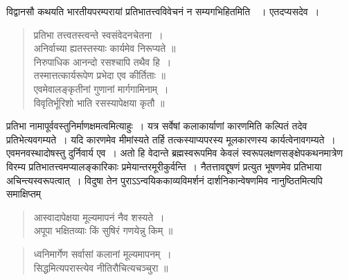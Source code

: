 {\dev विद्वानसौ कथयति भारतीयपरम्परायां प्रतिभातत्त्वविवेचनं न सम्यगभिहितमिति}~{\dev~। एतदप्यसदेव~।}
\begin{quote}
{\dev प्रतिभा तत्त्वतस्त्वन्ते स्वसंवेदनचेतना~।}\\
{\dev अनिर्वाच्या ह्यतस्तस्याः कार्यमेव निरूप्यते ॥}\\[5pt]
{\dev निरुपाधिक आनन्दो रसश्चापि तथैव हि~।}\\
{\dev तस्मात्तत्कार्यरूपेण प्रभेदा एव कीर्तिताः ॥}\\[5pt]
{\dev एवमेवालङ्कृतीनां गुणानां मार्गगामिनाम्~।}\\
{\dev विवृतिर्भूरिशो भाति रसस्यापेक्षया कृतौ ॥}
\end{quote}

{\dev प्रतिभा नामापूर्ववस्तुनिर्माणक्षमत्वमित्याहुः~। यत्र सर्वेषां कलाकार्याणां कारणमिति कल्पितं तदेव प्रतिभेत्यवगम्यते~। यदि कारणमेव मीमांस्यते तर्हि तत्कस्याप्यपरस्य मूलकारणस्य कार्यत्वेनावगम्यते~। एवमनवस्थादोषस्तु दुर्निवार्य एव~। अतो हि वेदान्ते ब्रह्मस्वरूपमिव केवलं स्वरूपलक्षणसङ्क्षेपकथनमात्रेण विरम्य प्रतिभातत्त्वमप्यालङ्कारिकाः प्रमेयान्तरमूरी\-कुर्वन्ति~। नैतत्तावद्दूषणं प्रत्युत भूषणमेव प्रतिभाया अचिन्त्यस्वरूपत्वात्~। विदुषा तेन पुराऽऽन्वयिककाव्यविमर्शनं दार्शनिकान्वेषणमिव नानुष्ठितमित्यपि समाक्षिप्तम्}   
\begin{quote}
{\dev आस्वादापेक्षया मूल्यमापनं नैव शस्यते~।}\\
{\dev अपूपा भक्षितव्याः किं सुषिरं गणयेन्नु किम् ॥}
\end{quote}
\begin{quote}
{\dev ध्वनिमार्गेण सर्वासां कलानां मूल्यमापनम्~।}\\
{\dev सिद्धमित्यपरास्त्येव नीतिरौचित्यचञ्चुरा ॥}
\end{quote}

